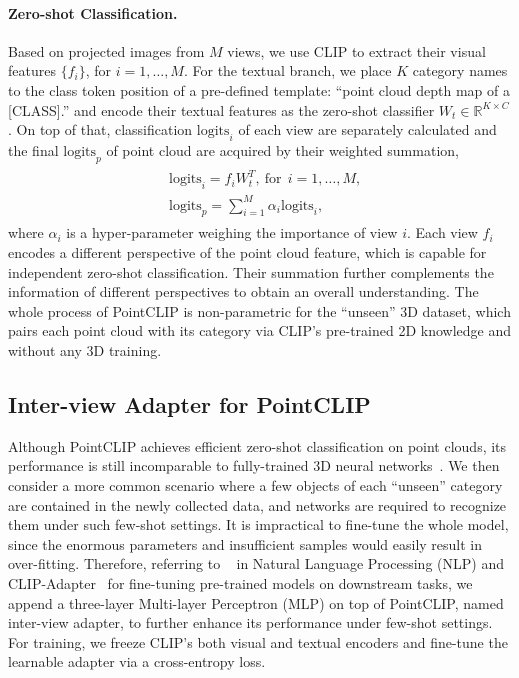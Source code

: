 \documentclass[10pt,twocolumn,letterpaper]{article}
\begin{document}
\vspace*{-12pt}
\paragraph{Zero-shot Classification.}
Based on projected images from $M$ views, we use CLIP to extract their visual features $\{f_i\}$, for $i=1,\dots,M$. For the textual branch, we place $K$ category names to the class token position of a pre-defined template: ``point cloud depth map of a [CLASS].'' and encode their textual features as the zero-shot classifier $W_t \in \mathbb{R}^{K \times C}$. On top of that, classification $\mathrm{logits}_i$ of each view are separately calculated and the final $\mathrm{logits}_p$ of point cloud are acquired by their weighted summation,
\begin{align}
\label{zeroshot}
\begin{split}
    &\mathrm{logits}_i = f_i W_t^T, \  \mathrm{for} \ \ i=1,\dots,M,\\
    &\mathrm{logits}_p = \sum\nolimits_{i=1}^M{\alpha_i \mathrm{logits}_i},
\end{split}
\end{align}
where $\alpha_i$ is a hyper-parameter weighing the importance of view $i$. Each view $f_i$ encodes a different perspective of the point cloud feature, which is capable for independent zero-shot classification. Their summation further complements the information of different perspectives to obtain an overall understanding. The whole process of PointCLIP is non-parametric for the ``unseen'' 3D dataset, which pairs each point cloud with its category via CLIP's pre-trained 2D knowledge and without any 3D training.


\vspace*{1pt}
\subsection{Inter-view Adapter for PointCLIP}
\label{inter-view}
Although PointCLIP achieves efficient zero-shot classification on point clouds, its performance is still incomparable to fully-trained 3D neural networks~\cite{qi2017pointnet,qi2017pointnet++}. We then consider a more common scenario where a few objects of each ``unseen'' category are contained in the newly collected data, and networks are required to recognize them under such few-shot settings. It is impractical to fine-tune the whole model, since the enormous parameters and insufficient samples would easily result in over-fitting. Therefore, referring to ~\cite{houlsby2019parameter} in Natural Language Processing (NLP) and CLIP-Adapter~\cite{gao2021clip} for fine-tuning pre-trained models on downstream tasks, we append a three-layer Multi-layer Perceptron (MLP) on top of PointCLIP, named inter-view adapter, to further enhance its performance under few-shot settings. For training, we freeze CLIP's both visual and textual encoders and fine-tune the learnable adapter via a cross-entropy loss.
\end{document}
